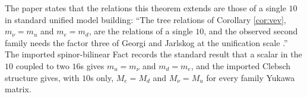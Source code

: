 The paper states that the relations this theorem extends are those of a single $10$ in standard unified model building: ``The tree relations of Corollary \ref{cor:vev}, $m_{\nu} = m_{u}$ and $m_{e} = m_{d}$, are the relations of a single $10$, and the observed second family needs the factor three of Georgi and Jarlskog at the unification scale \cite{GeorgiJarlskog1979}.'' The imported spinor-bilinear Fact  records the standard result that a scalar in the $10$ coupled to two $16$s gives $m_{u} = m_{\nu}$ and $m_{d} = m_{e}$, and the imported Clebsch structure  gives, with $10$s only, $M_{e} = M_{d}$ and $M_{\nu} = M_{u}$ for every family Yukawa matrix.

